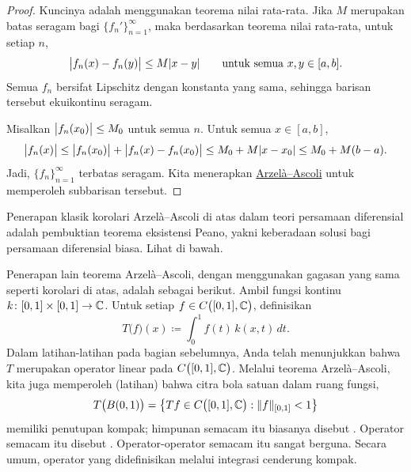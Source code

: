 \begin{proof}
Kuncinya adalah menggunakan teorema nilai rata-rata.  Jika $M$ merupakan batas seragam bagi
$\{ f_n' \}_{n=1}^\infty$, maka berdasarkan teorema nilai rata-rata, untuk setiap $n$,
\begin{equation*}
\bigl\lvert {f_n(x)-f_n(y)} \bigr\rvert \leq M \lvert {x-y} \rvert \qquad \text{untuk semua } x,y \in [a,b].
\end{equation*}
Semua $f_n$ bersifat Lipschitz dengan konstanta yang sama, sehingga
barisan tersebut
ekuikontinu seragam.

Misalkan $\bigl\lvert {f_n(x_0)} \bigr\rvert \leq M_0$ untuk semua $n$.
Untuk semua $x \in [a,b]$,
\begin{equation*}
\bigl\lvert {f_n(x)} \bigr\rvert \leq \bigl\lvert {f_n(x_0)} \bigr\rvert+ \bigl\lvert {f_n(x)-f_n(x_0)} \bigr\rvert \leq M_0+ M \lvert {x-x_0} \rvert
\leq M_0 + M(b-a) .
\end{equation*}
Jadi, $\{ f_n \}_{n=1}^\infty$ terbatas seragam.
Kita menerapkan \hyperref[thm:arzelaascoli]{Arzel\`a--Ascoli} untuk memperoleh subbarisan tersebut.
\end{proof}

Penerapan klasik korolari Arzel\`a--Ascoli di atas
dalam teori persamaan
diferensial adalah pembuktian teorema eksistensi
Peano, yakni keberadaan solusi bagi persamaan diferensial
biasa.  Lihat  di bawah.

\medskip

Penerapan lain teorema Arzel\`a--Ascoli, dengan menggunakan gagasan yang sama seperti
korolari di atas, adalah sebagai berikut.
Ambil fungsi kontinu $k \colon [0,1] \times [0,1] \to {\mathbb{C}}$.
Untuk setiap $f \in C\bigl([0,1],{\mathbb{C}}\bigr)$, definisikan
\begin{equation*}
T\bigl(f\bigr)(x) \coloneqq  \int_0^1 f(t) \, k(x,t)\,dt .
\end{equation*}
Dalam latihan-latihan pada bagian sebelumnya, Anda telah menunjukkan bahwa
$T$ merupakan operator linear pada $C\bigl([0,1],{\mathbb{C}}\bigr)$.
Melalui teorema Arzel\`a--Ascoli, kita juga memperoleh (latihan) bahwa
citra bola satuan dalam ruang fungsi,
\begin{equation*}
T\bigl( B(0,1) \bigr) = 
\bigl\{
Tf \in C\bigl([0,1],{\mathbb{C}}\bigr) :  
\lVert {f} \rVert_{[0,1]} < 1
\bigr\}
\end{equation*}
memiliki penutupan kompak; himpunan semacam itu biasanya disebut
\emph{}.
Operator semacam itu disebut \emph{}.
Operator-operator semacam itu sangat berguna.  Secara umum, operator yang didefinisikan melalui
integrasi cenderung kompak.

